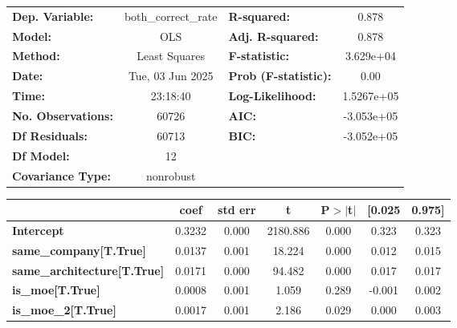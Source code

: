 \begin{center}
\begin{tabular}{lclc}
\toprule
\textbf{Dep. Variable:}             & both\_correct\_rate & \textbf{  R-squared:         } &     0.878   \\
\textbf{Model:}                     &         OLS         & \textbf{  Adj. R-squared:    } &     0.878   \\
\textbf{Method:}                    &    Least Squares    & \textbf{  F-statistic:       } & 3.629e+04   \\
\textbf{Date:}                      &   Tue, 03 Jun 2025  & \textbf{  Prob (F-statistic):} &     0.00    \\
\textbf{Time:}                      &       23:18:40      & \textbf{  Log-Likelihood:    } & 1.5267e+05  \\
\textbf{No. Observations:}          &         60726       & \textbf{  AIC:               } & -3.053e+05  \\
\textbf{Df Residuals:}              &         60713       & \textbf{  BIC:               } & -3.052e+05  \\
\textbf{Df Model:}                  &            12       & \textbf{                     } &             \\
\textbf{Covariance Type:}           &      nonrobust      & \textbf{                     } &             \\
\bottomrule
\end{tabular}
\begin{tabular}{lcccccc}
                                    & \textbf{coef} & \textbf{std err} & \textbf{t} & \textbf{P$> |$t$|$} & \textbf{[0.025} & \textbf{0.975]}  \\
\midrule
\textbf{Intercept}                  &       0.3232  &        0.000     &  2180.886  &         0.000        &        0.323    &        0.323     \\
\textbf{same\_company[T.True]}      &       0.0137  &        0.001     &    18.224  &         0.000        &        0.012    &        0.015     \\
\textbf{same\_architecture[T.True]} &       0.0171  &        0.000     &    94.482  &         0.000        &        0.017    &        0.017     \\
\textbf{is\_moe[T.True]}            &       0.0008  &        0.001     &     1.059  &         0.289        &       -0.001    &        0.002     \\
\textbf{is\_moe\_2[T.True]}         &       0.0017  &        0.001     &     2.186  &         0.029        &        0.000    &        0.003     \\

\end{tabular}
\end{center}
